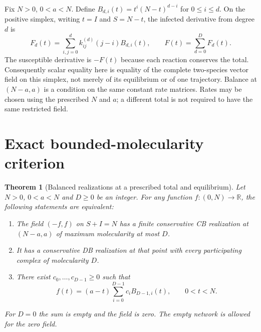 \documentclass[11pt]{article}
\newtheorem{theorem}{Theorem}[section]
\newcommand{\RR}{\mathbb R}
\begin{document}
Fix $N>0$, $0<a<N$. Define $B_{d,i}(t)=t^i(N-t)^{d-i}$ for $0\leq i\leq d$. On the positive simplex, writing $t=I$ and $S=N-t$, the infected derivative from degree $d$ is
\begin{equation}\label{field}
F_d(t)=\sum_{i,j=0}^{d} k^{(d)}_{ij}(j-i)B_{d,i}(t),
\qquad F(t)=\sum_{d=0}^D F_d(t).
\end{equation}
The susceptible derivative is $-F(t)$ because each reaction conserves the total. Consequently scalar equality here is equality of the complete two-species vector field on this simplex, not merely of its equilibrium or of one trajectory. Balance at $(N-a,a)$ is a condition on the same constant rate matrices. Rates may be chosen using the prescribed $N$ and $a$; a different total is not required to have the same restricted field.

\section{Exact bounded-molecularity criterion}
\begin{theorem}[Balanced realizations at a prescribed total and equilibrium]\label{main}
Let $N>0$, $0<a<N$ and $D\geq0$ be an integer. For any function $f:(0,N)\to\RR$, the following statements are equivalent:
\begin{enumerate}
\item The field $(-f,f)$ on $S+I=N$ has a finite conservative CB realization at $(N-a,a)$ of maximum molecularity at most $D$.
\item It has a conservative DB realization at that point with every participating complex of molecularity $D$.
\item There exist $c_0,\ldots,c_{D-1}\geq0$ such that
\begin{equation}\label{factor}
f(t)=(a-t)\sum_{i=0}^{D-1}c_i B_{D-1,i}(t),\qquad 0<t<N.
\end{equation}
\end{enumerate}
For $D=0$ the sum is empty and the field is zero. The empty network is allowed for the zero field.
\end{theorem}
\end{document}

